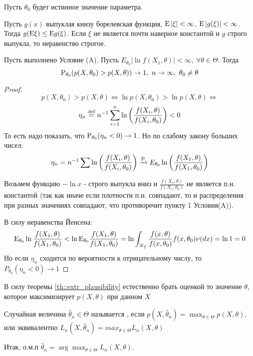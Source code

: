 Пусть \(\theta_0\) будет истинное значение параметра.
\begin{lemma}
    Пусть \(g(x)\) выпуклая книзу борелевская функция, \(\E\left\lvert \xi \right\rvert  <\infty\),
    \(\E\left\lvert g(\xi) \right\rvert  <\infty\). Тогда \(g(\E\xi) \leq \E g(\xi)\). Если \(\xi\)
    не является почти наверное константой и \(g\) строго выпукла, то неравенство строгое.
\end{lemma}
\begin{theorem} \label{th::extr_plausibility}
    Пусть выполнено Условие (A). Пусть \(E_{\theta_0} \left\lvert \ln f(X_1, \theta) \right\rvert  < \infty,\ \forall \theta \in \Theta\).
    Тогда
    \[\P_{\theta_0}(p(X, \theta_0) > p(X, \theta)) \rightarrow 1,\ n\rightarrow \infty,\ \theta_0 \neq \theta\]
\end{theorem}
\begin{proof}
    \[p(X, \theta_0) > p(X, \theta) \Leftrightarrow \ln p(X, \theta_0) > \ln p(X, \theta) \Leftrightarrow\]
    \[\eta_n\defeq n^{-1} \sum_{i=1}^n \ln \left(\frac{f(X_i, \theta)}{f(X_i, \theta_0)}\right) < 0\]
    То есть надо показать, что \(\P_{\theta_0}(\eta_n < 0) \rightarrow 1\). Но по слабому закону больших чисел:
    \[\eta_n = n^{-1}\sum \ln \left(\frac{f(X_i, \theta)}{f(X_i, \theta_0)} \right) \xrightarrow{\P}
    E_{\theta_0}\ln \left(\frac{f(X_1, \theta)}{f(X_1, \theta_0)} \right) \]

    Возьмем функцию \(-\ln x\) - строго выпукла вниз и \(\frac{f(X_1, \theta)}{f(X_1, \theta_0)}\)
    не является п.н. константой (так как иначе если плотности п.н. совпадают,
    то и распределения при разных значениях совпадают, что противоречит пункту 1 Условия(A)).

    В силу неравенства Йенсена:
    \[\E_{\theta_0} \ln \frac{f(X_1, \theta)}{f(X_1, \theta_0)} < \ln \E_{\theta_0} \frac{f(X_1, \theta)}{f(X_1, \theta_0)} = \ln \int_{N_f} \frac{f(x, \theta)}{f(x, \theta_0)} f(x, \theta_0) \nu(dx) = \ln1 = 0\]
    Но если \(\eta_n\) сходится по вероятности к отрицательному числу, то \(P_{\theta_0}(\eta_n < 0) \rightarrow 1\)
\end{proof}
В силу теоремы \ref{th::extr_plausibility} естественно брать
оценкой то значение \(\theta\), которое максимизирует \(p(X, \theta)\) при данном \(X\)

\begin{definition}
    Случайная величина \(\widehat{\theta}_n \in \Theta\) называется
    , если
    \(p(X, \widehat{\theta}_n) = \max_{\theta\in\Theta} p(X, \theta)\),
    или эквивалентно \(L_n(X, \widehat{\theta}_n) = max_{\theta\in\Theta} L_n(X, \theta)\)
\end{definition}
Итак, о.м.п \(\widehat{\theta}_n = \arg\max_{\theta\in\Theta} L_n(X, \theta)\).

